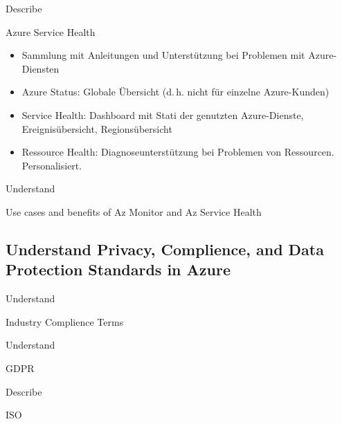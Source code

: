 \documentclass{scrartcl}
\newenvironment{flashcard}[2][]{%
    #1
    \vfill
    \centerline{\Large{#2}}
    \vfill
\newpage
}
{\newpage}
\newcommand{\subsectioncard}[1]{
    \vspace*{\stretch{1}}
    \subsection{#1}
    \vspace*{\stretch{1}}
    \pagebreak
}
\begin{document}
    \begin{flashcard}[Describe]{Azure Service Health}
        \begin{itemize}
            \item Sammlung mit Anleitungen und Unterstützung bei Problemen mit Azure-Diensten
            \item Azure Status:\newline
                Globale Übersicht (d.\,h. nicht für einzelne Azure-Kunden)
            \item Service Health:\newline
                Dashboard mit Stati der genutzten Azure-Dienste, Ereignisübersicht, Regionsübersicht
            \item Ressource Health:\newline
                Diagnoseunterstützung bei Problemen von Ressourcen. Personalisiert.
        \end{itemize}

    \end{flashcard}

    \begin{flashcard}[Understand]{Use cases and benefits of Az Monitor and Az Service Health}

    \end{flashcard}

    \subsectioncard{Understand Privacy, Complience, and Data Protection Standards in Azure}

    \begin{flashcard}[Understand]{Industry Complience Terms}

    \end{flashcard}

    \begin{flashcard}[Understand]{GDPR}

    \end{flashcard}

    \begin{flashcard}[Describe]{ISO}

    \end{flashcard}
\end{document}
